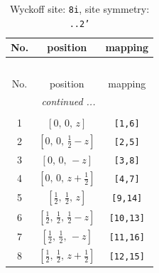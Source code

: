 \documentclass[fleqn,8pt]{jsarticle}
\begin{document}
\begin{longtable}{ccc}
\caption{Wyckoff site: {\tt 8i}, site symmetry: {\tt ..2'}}
 \\
 \hline \hline
No. & position & mapping \\ \hline \endfirsthead

\multicolumn{2}{l}{\tablename\ \thetable{}} \\
 \hline \hline
No. & position & mapping \\ \hline \endhead

 \hline \hline
\multicolumn{2}{r}{\footnotesize\it continued ...} \\ \endfoot

 \hline \hline
\multicolumn{2}{r}{} \\ \endlastfoot

1 & $\left[ 0,\, 0,\, z \right]$ & {\tt [1,6]} \\ \hline
2 & $\left[ 0,\, 0,\, \frac{1}{2} - z \right]$ & {\tt [2,5]} \\ \hline
3 & $\left[ 0,\, 0,\, - z \right]$ & {\tt [3,8]} \\ \hline
4 & $\left[ 0,\, 0,\, z + \frac{1}{2} \right]$ & {\tt [4,7]} \\ \hline
5 & $\left[ \frac{1}{2},\, \frac{1}{2},\, z \right]$ & {\tt [9,14]} \\ \hline
6 & $\left[ \frac{1}{2},\, \frac{1}{2},\, \frac{1}{2} - z \right]$ & {\tt [10,13]} \\ \hline
7 & $\left[ \frac{1}{2},\, \frac{1}{2},\, - z \right]$ & {\tt [11,16]} \\ \hline
8 & $\left[ \frac{1}{2},\, \frac{1}{2},\, z + \frac{1}{2} \right]$ & {\tt [12,15]} \\
\end{longtable}
\renewcommand{\arraystretch}{1.2}
\end{document}
